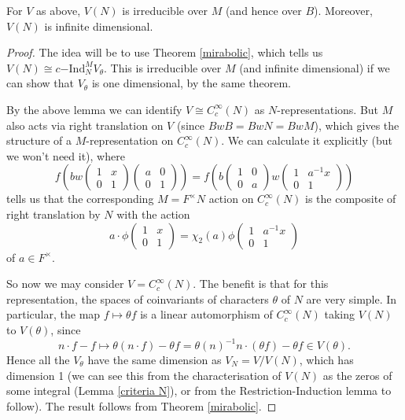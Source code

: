 \begin{prop}
    For $V$ as above, $V(N)$ is irreducible over $M$ (and hence over $B$). Moreover, $V(N)$ is infinite dimensional.
\end{prop}
\begin{proof}
    The idea will be to use Theorem \ref{mirabolic}, which tells us $V(N) \cong c\mathrm{-Ind}_N^M V_\theta$. This is irreducible over $M$ (and infinite dimensional) if we can show that $V_\theta$ is one dimensional, by the same theorem.

    By the above lemma we can identify $V \cong C_c^\infty(N)$ as $N$-representations. But $M$ also acts via right translation on $V$ (since $BwB=BwN=BwM$), which gives the structure of a $M$-representation on $C_c^\infty(N)$. We can calculate it explicitly (but we won't need it), where
    $$f\left(bw\begin{pmatrix}
        1&x\\0&1
    \end{pmatrix}\begin{pmatrix}
        a&0\\0&1
    \end{pmatrix}\right) = f\left(b \begin{pmatrix}
        1&0\\0&a
    \end{pmatrix}w\begin{pmatrix}
        1&a^{-1}x\\0&1
    \end{pmatrix}\right)$$
    tells us that the corresponding $M=F^\times N$ action on $C_c^\infty(N)$ is the composite of right translation by $N$ with the action 
    $$a\cdot \phi \begin{pmatrix}
        1&x\\0&1
    \end{pmatrix} = \chi_2(a) \phi \begin{pmatrix}
        1&a^{-1}x \\ 0&1
    \end{pmatrix}$$ of $a \in F^\times$.

    So now we may consider $V=C_c^\infty(N)$. The benefit is that for this representation, the spaces of coinvariants of characters $\theta$ of $N$ are very simple. In particular, the map $f \mapsto \theta f$ is a linear automorphism of $C_c^\infty(N)$ taking $V(N)$ to $V(\theta)$, since $$n \cdot f - f \mapsto \theta (n \cdot f) - \theta f = \theta(n)^{-1} n \cdot (\theta f) - \theta f \in V(\theta).$$
    Hence all the $V_\theta$ have the same dimension as $V_N=V/V(N)$, which has dimension 1 (we can see this from the characterisation of $V(N)$ as the zeros of some integral (Lemma \ref{criteria N}), or from the Restriction-Induction lemma to follow). The result follows from Theorem \ref{mirabolic}.
\end{proof}

